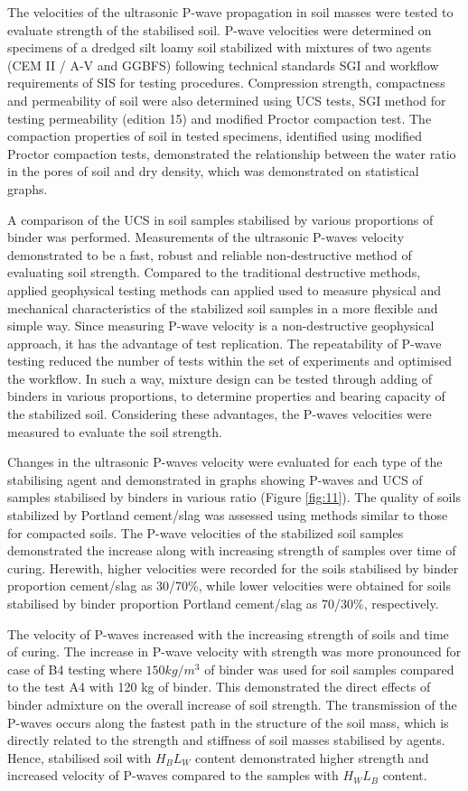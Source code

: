 \documentclass{amestyle}
\begin{document}
The velocities of the ultrasonic P-wave propagation in soil masses were tested to evaluate strength of the stabilised soil. P-wave velocities were determined on specimens of a dredged silt loamy soil stabilized with mixtures of two agents (CEM II / A-V and GGBFS) following technical standards SGI and workflow requirements of SIS for testing procedures. Compression strength, compactness and permeability of soil were also determined using UCS tests, SGI method for testing permeability (edition 15) and modified Proctor compaction test. The compaction properties of soil in tested specimens, identified using modified Proctor compaction tests, demonstrated the relationship between the water ratio in the pores of soil and dry density, which was demonstrated on statistical graphs.

A comparison of the UCS in soil samples stabilised by various proportions of binder was performed. Measurements of the ultrasonic P-waves velocity demonstrated to be a fast, robust and reliable non-destructive method of evaluating soil strength. Compared to the traditional destructive methods, applied geophysical testing methods can applied used to measure physical and mechanical characteristics of the stabilized soil samples in a more flexible and simple way. Since measuring P-wave velocity is a non-destructive geophysical approach, it has the advantage of test replication. The repeatability of P-wave testing reduced the number of tests within the set of experiments and optimised the workflow. In such a way, mixture design can be tested through adding of binders in various proportions, to determine properties and bearing capacity of the stabilized soil. Considering these advantages, the P-waves velocities were measured to evaluate the soil strength. 

Changes in the ultrasonic P-waves velocity were evaluated for each type of the stabilising agent and demonstrated in graphs showing P-waves and UCS of samples stabilised by binders in various ratio (Figure \ref{fig:11}). The quality of soils stabilized by Portland cement/slag was assessed using methods similar to those for compacted soils. The P-wave velocities of the stabilized soil samples demonstrated the increase along with increasing strength of samples over time of curing. Herewith, higher velocities were recorded for the soils stabilised by binder proportion cement/slag as 30/70\%, while lower velocities were obtained for soils stabilised by binder proportion Portland cement/slag as 70/30\%, respectively. 

The velocity of P-waves increased with the increasing strength of soils and time of curing. The increase in P-wave velocity with strength was more pronounced for case of B4 testing where $150 kg/m^3$ of binder was used for soil samples compared to the test A4 with 120 kg of binder. This demonstrated the direct effects of binder admixture on the overall increase of soil strength. The transmission of the P-waves occurs along the fastest path in the structure of the soil mass, which is directly related to the strength and stiffness of soil masses stabilised by agents. Hence, stabilised soil with $H_BL_W$ content demonstrated higher strength and increased velocity of P-waves compared to the samples with $H_WL_B$  content.
\end{document}
